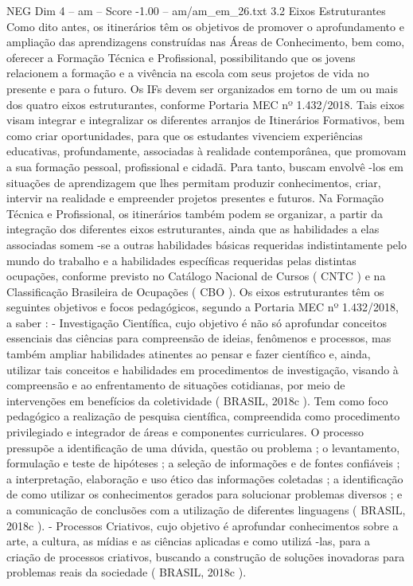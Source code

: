 \begin{textsample}{NEG Dim 4 – am – Score -1.00 – am/am\_em\_26.txt}  \label{ex:f4_neg_186}
3.2 Eixos Estruturantes Como dito antes, os itinerários têm os objetivos de promover o aprofundamento e ampliação das aprendizagens construídas nas Áreas de Conhecimento, bem como, oferecer a Formação Técnica e Profissional, possibilitando que os jovens relacionem a formação e a vivência na escola com seus projetos de vida no presente e para o futuro.
Os IFs devem ser organizados em torno de um ou mais dos quatro eixos estruturantes, conforme Portaria MEC nº 1.432/2018.
Tais eixos visam integrar e integralizar os diferentes arranjos de Itinerários Formativos, bem como criar oportunidades, para que os estudantes vivenciem experiências educativas, profundamente, associadas à realidade contemporânea, que promovam a sua formação pessoal, profissional e cidadã.
Para tanto, buscam envolvê -los em situações de aprendizagem que lhes permitam produzir conhecimentos, criar, intervir na realidade e empreender projetos presentes e futuros.
Na Formação Técnica e Profissional, os itinerários também podem se organizar, a partir da integração dos diferentes eixos estruturantes, ainda que as habilidades a elas associadas somem -se a outras habilidades básicas requeridas indistintamente pelo mundo do trabalho e a habilidades específicas requeridas pelas distintas ocupações, conforme previsto no Catálogo Nacional de Cursos ( CNTC ) e na Classificação Brasileira de Ocupações ( CBO ).
Os eixos estruturantes têm os seguintes objetivos e focos pedagógicos, segundo a Portaria MEC nº 1.432/2018, a saber : - Investigação Científica, cujo objetivo é não só aprofundar conceitos essenciais das ciências para compreensão de ideias, fenômenos e processos, mas também ampliar habilidades atinentes ao pensar e fazer científico e, ainda, utilizar tais conceitos e habilidades em procedimentos de investigação, visando à compreensão e ao enfrentamento de situações cotidianas, por meio de intervenções em benefícios da coletividade ( BRASIL, 2018c ).
Tem como foco pedagógico a realização de pesquisa científica, compreendida como procedimento privilegiado e integrador de áreas e componentes curriculares.
O processo pressupõe a identificação de uma dúvida, questão ou problema ; o levantamento, formulação e teste de hipóteses ; a seleção de informações e de fontes confiáveis ; a interpretação, elaboração e uso ético das informações coletadas ; a identificação de como utilizar os conhecimentos gerados para solucionar problemas diversos ; e a comunicação de conclusões com a utilização de diferentes linguagens ( BRASIL, 2018c ). - Processos Criativos, cujo objetivo é aprofundar conhecimentos sobre a arte, a cultura, as mídias e as ciências aplicadas e como utilizá -las, para a criação de processos criativos, buscando a construção de soluções inovadoras para problemas reais da sociedade ( BRASIL, 2018c ).

\end{textsample}
